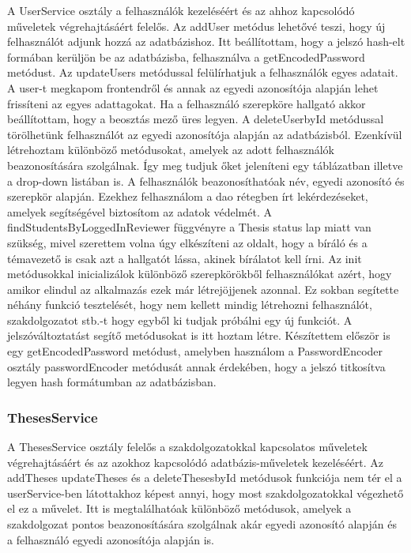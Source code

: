 A UserService osztály a felhasználók kezeléséért és az ahhoz kapcsolódó műveletek végrehajtásáért felelős. Az addUser metódus lehetővé teszi, hogy új felhasználót adjunk hozzá az adatbázishoz. Itt beállítottam, hogy a jelszó hash-elt formában kerüljön be az adatbázisba, felhasználva a getEncodedPassword metódust. Az updateUsers metódussal felülírhatjuk a felhasználók egyes adatait. A user-t megkapom frontendről és annak az egyedi azonosítója alapján lehet frissíteni az egyes adattagokat. Ha a felhasználó szerepköre hallgató akkor beállítottam, hogy a beosztás mező üres legyen. A deleteUserbyId metódussal törölhetünk felhasználót az egyedi azonosítója alapján az adatbázisból. Ezenkívül létrehoztam különböző metódusokat, amelyek az adott felhasználók beazonosítására szolgálnak. Így meg tudjuk őket jeleníteni egy táblázatban illetve a drop-down listában is. A felhasználók beazonosíthatóak név, egyedi azonosító és szerepkör alapján.
Ezekhez felhasználom a dao rétegben írt lekérdezéseket, amelyek segítségével biztosítom az adatok védelmét. A findStudentsByLoggedInReviewer függvényre a Thesis status lap miatt van szükség, mivel szerettem volna úgy elkészíteni az oldalt, hogy a bíráló és a témavezető is csak azt a hallgatót lássa, akinek bírálatot kell írni. Az init metódusokkal inicializálok különböző szerepkörökből felhasználókat azért, hogy amikor elindul az alkalmazás ezek már létrejöjjenek azonnal. Ez sokban segítette néhány funkció tesztelését, hogy nem kellett mindig létrehozni felhasználót, szakdolgozatot stb.-t hogy egyből ki tudjak próbálni egy új funkciót. A jelszóváltoztatást segítő metódusokat is itt hoztam létre. Készítettem először is egy getEncodedPassword metódust, amelyben használom a PasswordEncoder osztály passwordEncoder metódusát annak érdekében, hogy a jelszó titkosítva legyen hash formátumban az adatbázisban.

\subsubsection{ThesesService}

A ThesesService osztály felelős a szakdolgozatokkal kapcsolatos műveletek végrehajtásáért és az azokhoz kapcsolódó adatbázis-műveletek kezeléséért. Az addTheses updateTheses és a deleteThesesbyId metódusok funkciója nem tér el a userService-ben látottakhoz képest annyi, hogy most szakdolgozatokkal végezhető el ez a művelet. Itt is megtalálhatóak különböző metódusok, amelyek a szakdolgozat pontos beazonosítására szolgálnak akár egyedi azonosító alapján és a felhasználó egyedi azonosítója alapján is.

